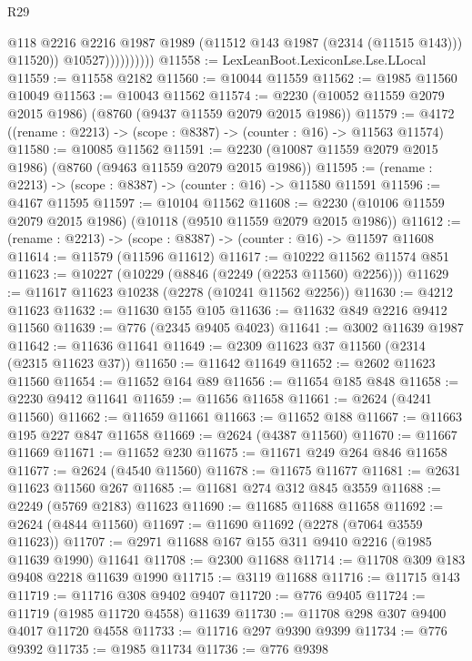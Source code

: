 \begin{lexlean}{R29}
\begin{coremodule}
                            @118
                            @2216
                            @2216
                            @1987
                            @1989
                            (@11512 @143 @1987 (@2314 (@11515 @143)))
                            @11520))
                        @10527))))))))))
@11558 := LexLeanBoot.LexiconLse.Lse.LLocal
@11559 := @11558 @2182
@11560 := @10044 @11559
@11562 := @1985 @11560 @10049
@11563 := @10043 @11562
@11574 := @2230 (@10052 @11559 @2079 @2015 @1986) (@8760 (@9437 @11559 @2079 @2015 @1986))
@11579 := @4172 ((rename : @2213) -> (scope : @8387) -> (counter : @16) -> @11563 @11574)
@11580 := @10085 @11562
@11591 := @2230 (@10087 @11559 @2079 @2015 @1986) (@8760 (@9463 @11559 @2079 @2015 @1986))
@11595 := (rename : @2213) -> (scope : @8387) -> (counter : @16) -> @11580 @11591
@11596 := @4167 @11595
@11597 := @10104 @11562
@11608 := @2230 (@10106 @11559 @2079 @2015 @1986) (@10118 (@9510 @11559 @2079 @2015 @1986))
@11612 := (rename : @2213) -> (scope : @8387) -> (counter : @16) -> @11597 @11608
@11614 := @11579 (@11596 @11612)
@11617 := @10222 @11562 @11574 @851
@11623 := @10227 (@10229 (@8846 (@2249 (@2253 @11560) @2256)))
@11629 := @11617 @11623 @10238 (@2278 (@10241 @11562 @2256))
@11630 := @4212 @11623
@11632 := @11630 @155 @105
@11636 := @11632 @849 @2216 @9412 @11560
@11639 := @776 (@2345 @9405 @4023)
@11641 := @3002 @11639 @1987
@11642 := @11636 @11641
@11649 := @2309 @11623 @37 @11560 (@2314 (@2315 @11623 @37))
@11650 := @11642 @11649
@11652 := @2602 @11623 @11560
@11654 := @11652 @164 @89
@11656 := @11654 @185 @848
@11658 := @2230 @9412 @11641
@11659 := @11656 @11658
@11661 := @2624 (@4241 @11560)
@11662 := @11659 @11661
@11663 := @11652 @188
@11667 := @11663 @195 @227 @847 @11658
@11669 := @2624 (@4387 @11560)
@11670 := @11667 @11669
@11671 := @11652 @230
@11675 := @11671 @249 @264 @846 @11658
@11677 := @2624 (@4540 @11560)
@11678 := @11675 @11677
@11681 := @2631 @11623 @11560 @267
@11685 := @11681 @274 @312 @845 @3559
@11688 := @2249 (@5769 @2183) @11623
@11690 := @11685 @11688 @11658
@11692 := @2624 (@4844 @11560)
@11697 := @11690 @11692 (@2278 (@7064 @3559 @11623))
@11707 := @2971 @11688 @167 @155 @311 @9410 @2216 (@1985 @11639 @1990) @11641
@11708 := @2300 @11688
@11714 := @11708 @309 @183 @9408 @2218 @11639 @1990
@11715 := @3119 @11688
@11716 := @11715 @143
@11719 := @11716 @308 @9402 @9407
@11720 := @776 @9405
@11724 := @11719 (@1985 @11720 @4558) @11639
@11730 := @11708 @298 @307 @9400 @4017 @11720 @4558
@11733 := @11716 @297 @9390 @9399
@11734 := @776 @9392
@11735 := @1985 @11734
@11736 := @776 @9398

\end{coremodule}
\end{lexlean}
